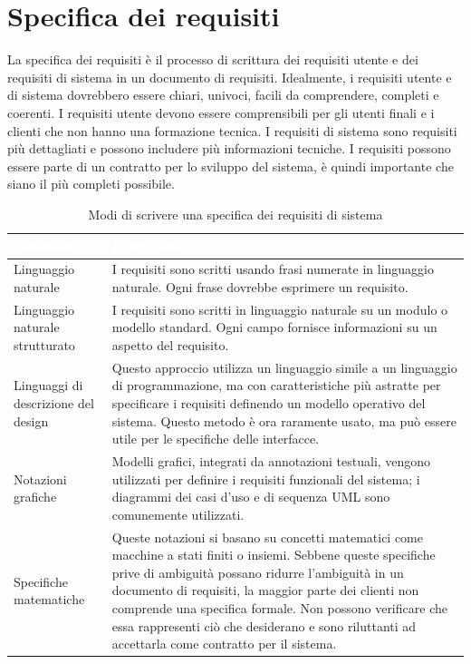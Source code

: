 \section{Specifica dei requisiti}
La specifica dei requisiti è il processo di scrittura dei requisiti utente e dei requisiti di sistema in un documento di requisiti. Idealmente, i requisiti utente e di sistema dovrebbero essere chiari, univoci, facili da comprendere, completi e coerenti. I requisiti utente devono essere comprensibili per gli utenti finali e i clienti che non hanno una formazione tecnica. I requisiti di sistema sono requisiti più dettagliati e possono includere più informazioni tecniche. I requisiti possono essere parte di un contratto per lo sviluppo del sistema, è quindi importante che siano il più completi possibile.

\begin{table}[ht]
\centering
{}
\begin{tabular}{|p{4cm}|p{11cm}|}
\hline
\rowcolor{headerblue}
\textbf{\textcolor{white}{Notazione}} & \textbf{\textcolor{white}{Descrizione}} \\\hline
Linguaggio naturale & I requisiti sono scritti usando frasi numerate in linguaggio naturale. Ogni frase dovrebbe esprimere un requisito.\\\hline
Linguaggio naturale strutturato & I requisiti sono scritti in linguaggio naturale su un modulo o modello standard. Ogni campo fornisce informazioni su un aspetto del requisito.\\\hline
Linguaggi di descrizione del design & Questo approccio utilizza un linguaggio simile a un linguaggio di programmazione, ma con caratteristiche più astratte per specificare i requisiti definendo un modello operativo del sistema. Questo metodo è ora raramente usato, ma può essere utile per le specifiche delle interfacce.\\\hline
Notazioni grafiche & Modelli grafici, integrati da annotazioni testuali, vengono utilizzati per definire i requisiti funzionali del sistema; i diagrammi dei casi d'uso e di sequenza UML sono comunemente utilizzati.\\\hline
Specifiche matematiche & Queste notazioni si basano su concetti matematici come macchine a stati finiti o insiemi. Sebbene queste specifiche prive di ambiguità possano ridurre l'ambiguità in un documento di requisiti, la maggior parte dei clienti non comprende una specifica formale. Non possono verificare che essa rappresenti ciò che desiderano e sono riluttanti ad accettarla come contratto per il sistema.
\\\hline
\end{tabular}
\caption{Modi di scrivere una specifica dei requisiti di sistema}
\label{tab:writing-system-requirements}
\end{table}

